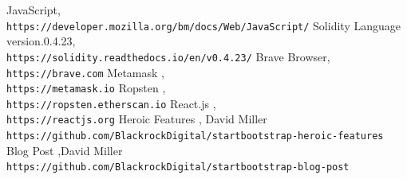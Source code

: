 \documentclass[]{scrreprt}
\begin{document}
\begin{appendices}


\end{appendices}

\begin{thebibliography}{9}

		JavaScript,
		\\\texttt{https://developer.mozilla.org/bm/docs/Web/JavaScript/}
		Solidity Language version.0.4.23,
		\\\texttt{https://solidity.readthedocs.io/en/v0.4.23/}
		Brave Browser,
		\\\texttt{https://brave.com}
		Metamask ,
		\\\texttt{https://metamask.io}
			Ropsten , 
			\\\texttt{https://ropsten.etherscan.io}
	React.js , 
	\\\texttt{https://reactjs.org}
	Heroic Features , David Miller
	\\\texttt{https://github.com/BlackrockDigital/startbootstrap-heroic-features}
	Blog Post ,David Miller 
	\\\texttt{https://github.com/BlackrockDigital/startbootstrap-blog-post}
			
		
\end{thebibliography}
\end{document}
